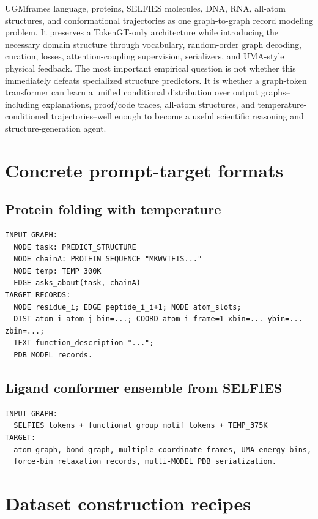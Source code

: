\documentclass[11pt]{article}
\newcommand{\1}{\mathbf{1}}
\newcommand{\UGM}{\textsc{UGM}}
\begin{document}
\UGM frames language, proteins, SELFIES molecules, DNA, RNA, all-atom structures, and conformational trajectories as one graph-to-graph record modeling problem. It preserves a TokenGT-only architecture while introducing the necessary domain structure through vocabulary, random-order graph decoding, curation, losses, attention-coupling supervision, serializers, and UMA-style physical feedback. The most important empirical question is not whether this immediately defeats specialized structure predictors. It is whether a graph-token transformer can learn a unified conditional distribution over output graphs--including explanations, proof/code traces, all-atom structures, and temperature-conditioned trajectories--well enough to become a useful scientific reasoning and structure-generation agent.

\appendix
\section{Concrete prompt-target formats}

\subsection{Protein folding with temperature}
\begin{lstlisting}
INPUT GRAPH:
  NODE task: PREDICT_STRUCTURE
  NODE chainA: PROTEIN_SEQUENCE "MKWVTFIS..."
  NODE temp: TEMP_300K
  EDGE asks_about(task, chainA)
TARGET RECORDS:
  NODE residue_i; EDGE peptide_i_i+1; NODE atom_slots;
  DIST atom_i atom_j bin=...; COORD atom_i frame=1 xbin=... ybin=... zbin=...;
  TEXT function_description "...";
  PDB MODEL records.
\end{lstlisting}

\subsection{Ligand conformer ensemble from SELFIES}
\begin{lstlisting}
INPUT GRAPH:
  SELFIES tokens + functional group motif tokens + TEMP_375K
TARGET:
  atom graph, bond graph, multiple coordinate frames, UMA energy bins,
  force-bin relaxation records, multi-MODEL PDB serialization.
\end{lstlisting}

\section{Dataset construction recipes}
\end{document}
